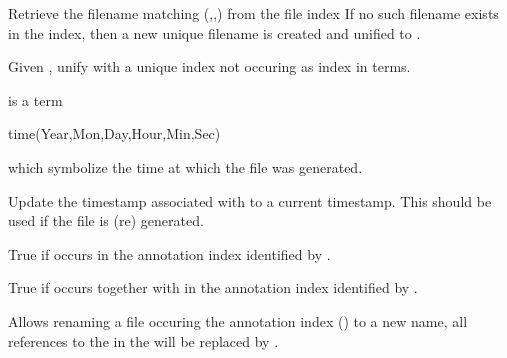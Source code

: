 \begin{description}
Retrieve the filename matching (,,) from the file index
If no such filename exists in the index, then a new unique filename is created
and unified to .

Given , unify  with a unique index not occuring as index in terms.

 is a term

\begin{code}
time(Year,Mon,Day,Hour,Min,Sec)
\end{code}

which symbolize the time at which the file  was generated.

Update the timestamp associated with  to a current timestamp.
This should be used if the file is (re) generated.

True if  occurs in the annotation index identified by .

True if  occurs together with  in the annotation index identified by .

Allows renaming a file  occuring the annotation index () to a new name, 
all references to the  in the  will be replaced by .
\end{description}

